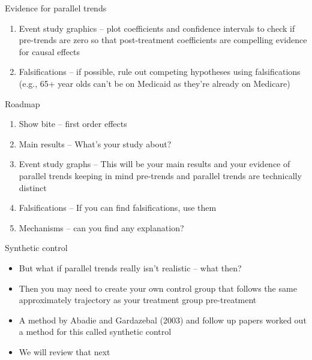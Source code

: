 \documentclass{beamer}
\begin{document}
\begin{frame}{Evidence for parallel trends}

\begin{enumerate}

\item Event study graphics -- plot coefficients and confidence intervals to check if pre-trends are zero so that post-treatment coefficients are compelling evidence for causal effects
\item Falsifications -- if possible, rule out competing hypotheses using falsifications (e.g., 65+ year olds can't be on Medicaid as they're already on Medicare)

\end{enumerate}

\end{frame}

\begin{frame}{Roadmap}

\begin{enumerate}
\item Show bite -- first order effects
\item Main results -- What's your study about?
\item Event study graphs -- This will be your main results and your evidence of parallel trends keeping in mind pre-trends and parallel trends are technically distinct
\item Falsifications -- If you can find falsifications, use them
\item Mechanisms -- can you find any explanation?
\end{enumerate}

\end{frame}

\begin{frame}{Synthetic control}

\begin{itemize}

\item But what if parallel trends really isn't realistic -- what then?
\item Then you may need to create your own control group that follows the same approximately trajectory as your treatment group pre-treatment
\item A method by Abadie and Gardazebal (2003) and follow up papers worked out a method for this called synthetic control
\item We will review that next
\end{itemize}

\end{frame}
\end{document}
